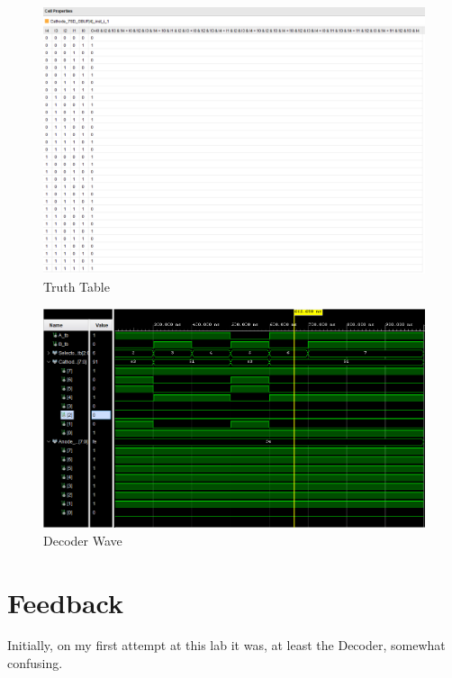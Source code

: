 \documentclass{article}
\begin{document}
\begin{figure}[h]
\begin{center}
\includegraphics[width=1\textwidth]{DecoderTruthTable.png} %
\caption{Truth Table}
\end{center}
\end{figure}


\begin{figure}[h]
\begin{center}
\includegraphics[width=1\textwidth]{DecoderWaveForm.png} %
\caption{Decoder Wave}
\end{center}
\end{figure} 

\section{Feedback}
Initially, on my first attempt at this lab it was, at least the Decoder, somewhat confusing.







\end{document}
